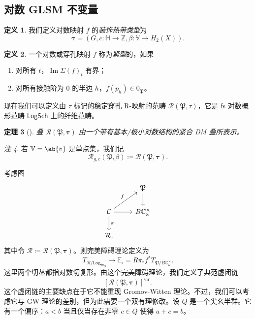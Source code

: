 \documentclass{amsart}
\newtheorem{thm}{定理}[section]
\theoremstyle{definition}
\newtheorem{defn}[thm]{定义}
\theoremstyle{remark}
\newtheorem{rmk}[thm]{注}
\theoremstyle{plain}
\theoremstyle{definition}
\theoremstyle{remark}
\DeclareMathOperator{\Ima}{Im}
\newcommand{\C}{\mathbb{C}}
\newcommand{\Z}{\mathbb{Z}}
\newcommand{\E}{\mathbb{E}}
\newcommand{\V}{\mathbb{V}}
\renewcommand{\H}{\mathbb{H}}
\newcommand{\mc}[1]{\mathcal{#1}}
\newcommand{\mf}[1]{\mathfrak{#1}}
\newcommand{\mr}[1]{\mathrm{#1}}
\newcommand{\ms}[1]{\mathsf{#1}}
\newcommand{\1}{\mathbf{1}}
\newcommand{\2}{\mathbf{2}}
\newcommand{\3}{\mathbf{3}}
\newcommand{\vir}{\mr{vir}}
\begin{document}
\subsection{对数 GLSM 不变量}%
\label{sub:Log GLSM invariants}

\begin{defn}
    我们定义对数映射 \(f\) 的\textit{装饰热带类型}为
    \[ \bm{\tau} = (G, c \colon \H \to \Z, \beta \colon \V \to H_2(X)). \]
\end{defn}

\begin{defn}
    一个对数或穿孔映射 \(f\) 称为\textit{紧型}的，如果
    \begin{enumerate}
        \item 对所有 \(t\)，\(\Ima \Sigma(f)_t\) 有界；
        \item 对所有接触阶为 \(0\) 的半边 \(h\)，\(f(p_h) \in 0_{\mf{P}}\)。
    \end{enumerate}
\end{defn}

现在我们可以定义由 \(\tau\) 标记的稳定穿孔 R-映射的范畴 \(\mc{R}(\mf{P}, \tau)\)，它是 fs 对数概形范畴 \(\ms{LogSch}\) 上的纤维范畴。

\begin{thm}[{\cite{CJR2021,CJRpunctured}}]
    叠 \(\mc{R}(\mf{P},\bm{\tau})\) 由一个带有基本/极小对数结构的紧合 DM 叠所表示。
\end{thm}

\begin{rmk}
    若 \(\V = \ab\{v\}\) 是单点集，我们记
    \[ \mc{R}_{g, c}(\mf{P}, \beta) \coloneqq \mc{R}(\mf{P}, \bm{\tau}). \]
\end{rmk}

考虑图
\begin{equation*}
\begin{tikzcd}
    & \mf{P} \ar{d} \\
    \mc{C} \ar{ur}{f} \ar{d}{\pi} \ar{r} & B \C_{\omega}^{\times} \\
    \mc{R},
\end{tikzcd}
\end{equation*}
其中令 \(\mc{R} \coloneqq \mc{R}(\mf{P}, \bm{\tau})\)。则完美障碍理论定义为
\[ T_{\mc{R}/\ms{Log}_{\mf{M}_G}} \to \E_{\square} = R \pi_* f^* T_{\mf{P}/B\C_{\omega}^{\times}}. \]
这里两个切丛都指对数切复形。由这个完美障碍理论，我们定义了典范虚闭链
\[ [\mc{R}(\mf{P}, \bm{\tau})]^{\vir}. \]
这个虚闭链的主要缺点在于它不能重现 Gromov-Witten 理论。不过，我们可以考虑它与 GW 理论的差别，但为此需要一个双有理修改。设 \(Q\) 是一个尖幺半群。它有一个偏序：\(a < b\) 当且仅当存在非零 \(c \in Q\) 使得 \(a+c = b\)。
\end{document}
